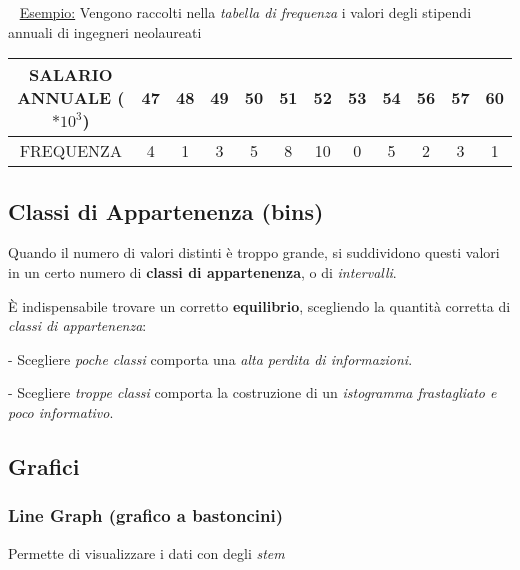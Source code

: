 \documentclass[12pt,oneside,draft]{book}
\begin{document}
~\newline
\underline{Esempio:} \newline
\noindent Vengono raccolti nella \emph{tabella di frequenza} i valori degli stipendi annuali di
ingegneri neolaureati

\begin{center}
    \bgroup
    \def\arraystretch{1.5}
    \begin{tabular}{ |c| c c c c c c c c c c c|}
        \hline
        SALARIO ANNUALE ($*10^3$) & 47 & 48 & 49 & 50 & 51 & 52 & 53 & 54 & 56 & 57 & 60 \\
        \hline
        FREQUENZA                 & 4  & 1  & 3  & 5  & 8  & 10 & 0  & 5  & 2  & 3  & 1  \\
        \hline
    \end{tabular}
    \egroup
\end{center}

\subsection{Classi di Appartenenza (bins)}
Quando il numero di valori distinti è troppo grande, si suddividono questi valori in un certo
numero di \textbf{classi di appartenenza}, o di \emph{intervalli}.

È indispensabile trovare un corretto \textbf{equilibrio}, scegliendo la quantità corretta di \emph{classi di appartenenza}:

- Scegliere \emph{poche classi} comporta una \emph{alta perdita di informazioni}.

- Scegliere \emph{troppe classi} comporta la costruzione di un \emph{istogramma frastagliato e poco informativo}.


\subsection{Grafici}
\subsubsection{Line Graph (grafico a bastoncini)}
Permette di visualizzare i dati con degli \emph{stem}

\end{document}
